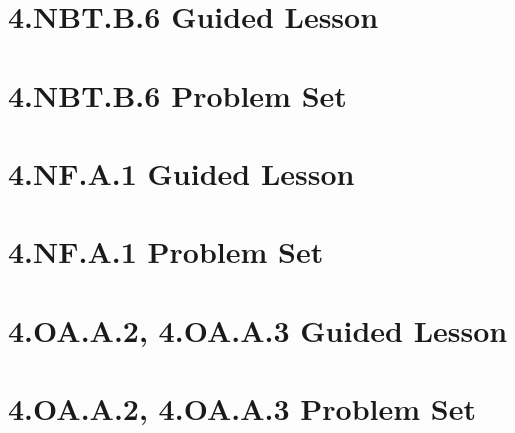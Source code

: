 \documentclass[a4paper,12pt]{article}
\begin{document}
\newpage
\section{4.NBT.B.6 Guided Lesson}


\newpage
\section{4.NBT.B.6 Problem Set}


\newpage
\section{4.NF.A.1 Guided Lesson}


\newpage
\section{4.NF.A.1 Problem Set}


\newpage
\section{4.OA.A.2, 4.OA.A.3 Guided Lesson}


\newpage
\section{4.OA.A.2, 4.OA.A.3 Problem Set}

\end{document}
